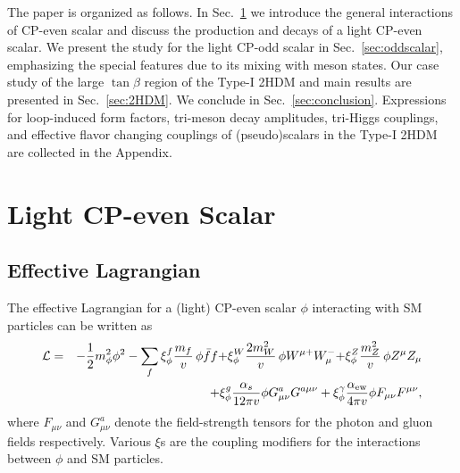 \documentclass[letterpaper,11pt]{article}
\begin{document}
The paper is organized as follows.  In Sec.~\ref{sec:evenscalar} we introduce the general interactions of CP-even scalar and discuss  the production and decays of a light CP-even scalar. We present the study for the light CP-odd scalar in Sec.~\ref{sec:oddscalar}, emphasizing the special features due to its mixing with meson states.  Our case study of the large $\tan\beta$ region of the Type-I 2HDM and main results are presented in Sec.~\ref{sec:2HDM}. We conclude  in Sec.~\ref{sec:conclusion}. Expressions for loop-induced form factors, tri-meson decay amplitudes, tri-Higgs couplings, and effective flavor changing couplings of (pseudo)scalars in the Type-I 2HDM are collected in the Appendix.




\section{Light CP-even Scalar}
\label{sec:evenscalar}
 
\subsection{Effective Lagrangian}
The effective Lagrangian for a (light) CP-even scalar $\phi$ interacting with SM particles can be written as~\cite{Zyla:2020zbs}
\begin{eqnarray}
 \mathcal{L} &=& - \frac{1}{2}{m_\phi^{\textcolor{black}{2}}} \phi^2 - \sum_f  {\xi_{\phi}^{f}}  \frac{m_f}{v} \, \phi \bar{f} f    {+} {\xi_{\phi}^{W}} \frac{2m_W^2}{v} \, \phi W^{\mu+} W^-_\mu {+} {\xi_{\phi}^{Z}} \frac{m_Z^2}{v} \, \phi Z^{\mu} Z_\mu  \nonumber \\ 
 &&+ {\xi_{\phi}^{ g}} \frac{\alpha_s}{12\pi v} \phi G_{\mu\nu}^a G^{a\mu\nu}  +  {\xi_{\phi}^{\gamma}} \frac{\alpha_{\rm ew}}{4\pi v} \phi F_{\mu\nu} F^{\mu\nu}, 
\label{eq:phi_lag}
\end{eqnarray}
where $F_{\mu\nu}$ and $G_{\mu\nu}^a$ denote the field-strength tensors for the photon and gluon fields respectively.  Various $\xi$s are the coupling modifiers for the interactions between $\phi$ and SM particles.
 
\end{document}
